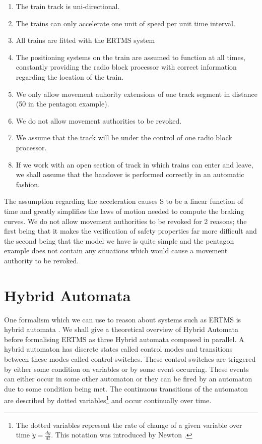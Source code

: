 \begin{enumerate}

\item The train track is uni-directional.

\item The trains can only accelerate one unit of speed per unit time interval.

\item All trains are fitted with the ERTMS system

\item The positioning systems on the train are assumed to function at all times, constantly providing the radio block processor with correct information regarding the location of the train.

\item We only allow movement auhority extensions of one track segment in distance (50 in the pentagon example).

\item We do not allow movement authorities to be revoked.

\item  We assume that the track will be under the control of one radio block processor.

\item  If we work with an open section of track in which trains can enter and leave, we shall assume that the handover is performed correctly in an automatic fashion.

\end{enumerate}

The assumption regarding the acceleration causes S to be a linear function of time and greatly simplifies the laws of motion needed to compute the braking curves.   We do not allow movement authorities to be revoked for 2 reasons; the first being that it makes the verification of safety properties far more difficult and the second being that the model we have is quite simple and the pentagon example does not contain any situations which would cause a movement authority to be revoked.




\section{Hybrid Automata} \label{sec:hybrid}

One formalism which we can use to reason about systems such as ERTMS is hybrid automata \cite{TH96}. We shall give a theoretical overview of Hybrid Automata before formalising ERTMS as three Hybrid automata composed in parallel. A hybrid automaton has discrete states called control modes and transitions between these modes called control switches. These control switches are triggered by either some condition on variables or by some event occurring. These events can either occur in some other automaton or they can be fired by an automaton due to some condition being met. The continuous transitions of the automaton are described by dotted variables\footnote{The dotted variables represent the rate of change of a given variable over time $\dot{y} = \frac{dy}{dt}$. This notation was introduced by Newton \cite{CF28}.} and occur continually over time.



